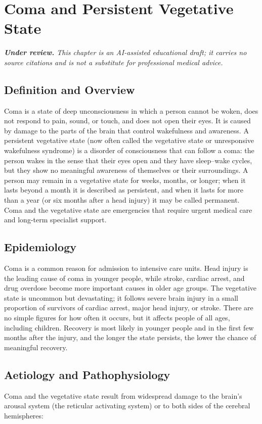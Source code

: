 \chapter{Coma and Persistent Vegetative State}

\medskip
\noindent\textit{\textbf{Under review.} This chapter is an AI-assisted educational draft; it carries no source citations and is not a substitute for professional medical advice.}

\section*{Definition and Overview}
Coma is a state of deep unconsciousness in which a person cannot be woken, does not respond to pain, sound, or touch, and does not open their eyes. It is caused by damage to the parts of the brain that control wakefulness and awareness. A persistent vegetative state (now often called the vegetative state or unresponsive wakefulness syndrome) is a disorder of consciousness that can follow a coma: the person wakes in the sense that their eyes open and they have sleep--wake cycles, but they show no meaningful awareness of themselves or their surroundings. A person may remain in a vegetative state for weeks, months, or longer; when it lasts beyond a month it is described as persistent, and when it lasts for more than a year (or six months after a head injury) it may be called permanent. Coma and the vegetative state are emergencies that require urgent medical care and long-term specialist support.

\section*{Epidemiology}
Coma is a common reason for admission to intensive care units. Head injury is the leading cause of coma in younger people, while stroke, cardiac arrest, and drug overdose become more important causes in older age groups. The vegetative state is uncommon but devastating; it follows severe brain injury in a small proportion of survivors of cardiac arrest, major head injury, or stroke. There are no simple figures for how often it occurs, but it affects people of all ages, including children. Recovery is most likely in younger people and in the first few months after the injury, and the longer the state persists, the lower the chance of meaningful recovery.

\section*{Aetiology and Pathophysiology}
Coma and the vegetative state result from widespread damage to the brain's arousal system (the reticular activating system) or to both sides of the cerebral hemispheres:


